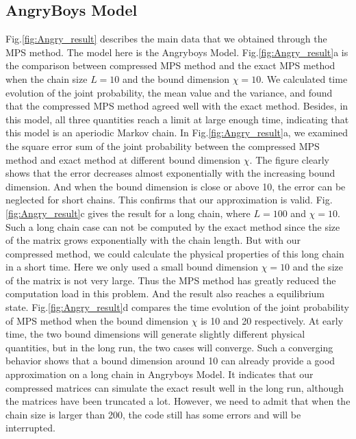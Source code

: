 \documentclass[english]{article}
\begin{document}
\subsection{AngryBoys Model}
    Fig.\ref{fig:Angry_result} describes the main data that we obtained through the MPS method. The model here is the Angryboys Model. Fig.\ref{fig:Angry_result}a is the comparison between compressed MPS method and the exact MPS method when the chain size $L=10$ and the bound dimension $\chi=10$. We calculated time evolution of the joint probability, the mean value and the variance, and found that the compressed MPS method agreed well with the exact method. Besides, in this model, all three quantities reach a limit at large enough time, indicating that this model is an aperiodic Markov chain. In Fig.\ref{fig:Angry_result}a, we examined the square error sum of the joint probability between the compressed MPS method and exact method at different bound dimension $\chi$. The figure clearly shows that the error decreases almost exponentially with the increasing bound dimension. And when the bound dimension is close or above 10, the error can be neglected for short chains. This confirms that our approximation is valid. Fig.\ref{fig:Angry_result}c gives the result for a long chain, where $L=100$ and $\chi=10$. Such a long chain case can not be computed by the exact method since the size of the matrix grows exponentially with the chain length. But with our compressed method, we could calculate the physical properties of this long chain in a short time. Here we only used a small bound dimension $\chi=10$ and the size of the matrix is not very large. Thus the MPS method has greatly reduced the computation load in this problem. And the result also reaches a equilibrium state. Fig.\ref{fig:Angry_result}d compares the time evolution of the joint probability of MPS method when the bound dimension $\chi$ is 10 and 20 respectively. At early time, the two bound dimensions will generate slightly different physical quantities, but in the long run, the two cases will converge. Such a converging behavior shows that a bound dimension around 10 can already provide a good approximation on a long chain in Angryboys Model. It indicates that our compressed matrices can simulate the exact result well in the long run, although the matrices have been truncated a lot. However, we need to admit that when the chain size is larger than 200, the code still has some errors and will be interrupted.
    
\end{document}
